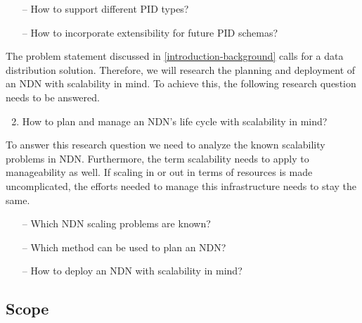 
\begin{itemize}
    \item[--] How to support different PID types?
    \item[--] How to incorporate extensibility for future PID schemas?
\end{itemize}

The problem statement discussed in \ref{introduction-background} calls for a data distribution solution. Therefore, we will research the planning and deployment of an NDN with scalability in mind. To achieve this, the following research question needs to be answered.
\begin{enumerate}
\setcounter{enumi}{1}
    \item How to plan and manage an NDN's life cycle with scalability in mind?
\end{enumerate}

To answer this research question we need to analyze the known scalability problems in NDN. Furthermore, the term scalability needs to apply to manageability as well. If scaling in or out in terms of resources is made uncomplicated, the efforts needed to manage this infrastructure needs to stay the same.
\begin{itemize}
    \item[--] Which NDN scaling problems are known?
    \item[--] Which method can be used to plan an NDN?
    \item[--] How to deploy an NDN with scalability in mind?
\end{itemize}

\subsection{Scope}
\label{introduction-scope}

